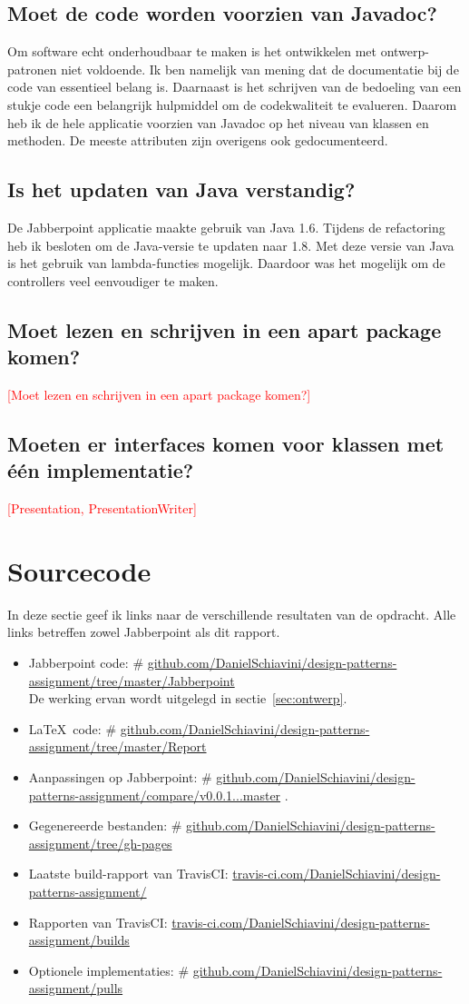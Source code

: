 \documentclass[a4paper]{article}
\makeatletter
\newcommand{\todo}[1]{\textcolor{red}{[#1]}\\}
\newcommand*{\repo}{\begingroup\@makeother\#\@repo}
\newcommand*{\@repo}[2]{%
  \href{https://github.com/DanielSchiavini/design-patterns-assignment/#1}{#2}%
  \endgroup}
\newcommand{\repolink}[1]{\repo{#1}{github.com\-/Daniel\-Schiavini\-/de\-sign-\-pat\-terns-\-as\-sign\-ment\-/#1}}
\newcommand{\cilink}[1]{\href{https://travis-ci.com/DanielSchiavini/design-patterns-assignment/#1}{travis-ci.com/DanielSchiavini/design-patterns-assignment/#1}}
\newcommand{\question}[1]{
  \subsection{#1}
}
\makeatother
\begin{document}
    \question{Moet de code worden voorzien van Javadoc?}
		Om software echt onderhoudbaar te maken is het ontwikkelen met ontwerp-patronen niet voldoende.
		Ik ben namelijk van mening dat de documentatie bij de code van essentieel belang is.
		Daarnaast is het schrijven van de bedoeling van een stukje code een belangrijk hulpmiddel om de codekwaliteit te evalueren.
		Daarom heb ik de hele applicatie voorzien van Javadoc op het niveau van klassen en methoden.
		De meeste attributen zijn overigens ook gedocumenteerd.

	\question{Is het updaten van Java verstandig?}
		De Jabberpoint applicatie maakte gebruik van Java 1.6.
		Tijdens de refactoring heb ik besloten om de Java-versie te updaten naar 1.8.
		Met deze versie van Java is het gebruik van lambda-functies mogelijk.
		Daardoor was het mogelijk om de controllers veel eenvoudiger te maken.

	\question{Moet lezen en schrijven in een apart package komen?}
		\todo{Moet lezen en schrijven in een apart package komen?}
	
	\question{Moeten er interfaces komen voor klassen met één implementatie?}
		\todo{Presentation, PresentationWriter}

\section{Sourcecode}\label{sec:source}
	In deze sectie geef ik links naar de verschillende resultaten van de opdracht.
	Alle links betreffen zowel Jabberpoint als dit rapport.
	\begin{itemize}
		\item Jabberpoint code:
			\repolink{tree/master/Jabberpoint}\\
			De werking ervan wordt uitgelegd in sectie~\ref{sec:ontwerp}.
		\item \LaTeX ~code:
			\repo{tree/master/Report}{github.com/DanielSchiavini/design-patterns-assignment/tree\-/master\-/Report}
		\item Aanpassingen op Jabberpoint:
			\repolink{compare/v0.0.1...master}.
		\item Gegenereerde bestanden:
			\repolink{tree/gh-pages}
		\item Laatste build-rapport van TravisCI:
			\cilink{}
		\item Rapporten van TravisCI:
			\cilink{builds}
		\item Optionele implementaties:
			\repolink{pulls}
	\end{itemize}
\end{document}
